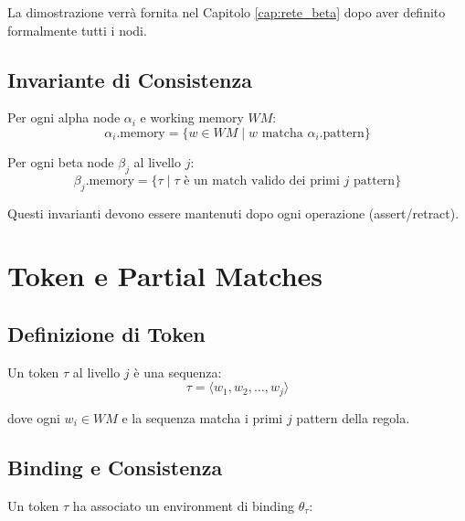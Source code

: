 La dimostrazione verrà fornita nel Capitolo \ref{cap:rete_beta} dopo aver definito formalmente tutti i nodi.

\subsection{Invariante di Consistenza}

\begin{definizione}
Per ogni alpha node $\alpha_i$ e working memory $WM$:
\begin{equation}
\alpha_i.\text{memory} = \{w \in WM \mid w \text{ matcha } \alpha_i.\text{pattern}\}
\end{equation}
\end{definizione}

\begin{definizione}
Per ogni beta node $\beta_j$ al livello $j$:
\begin{equation}
\beta_j.\text{memory} = \{\tau \mid \tau \text{ è un match valido dei primi } j \text{ pattern}\}
\end{equation}
\end{definizione}

Questi invarianti devono essere mantenuti dopo ogni operazione (assert/retract).

\section{Token e Partial Matches}

\subsection{Definizione di Token}

\begin{definizione}[Token]
Un token $\tau$ al livello $j$ è una sequenza:
\begin{equation}
\tau = \langle w_1, w_2, \ldots, w_j \rangle
\end{equation}

dove ogni $w_i \in WM$ e la sequenza matcha i primi $j$ pattern della regola.
\end{definizione}

\subsection{Binding e Consistenza}

Un token $\tau$ ha associato un environment di binding $\theta_\tau$:

